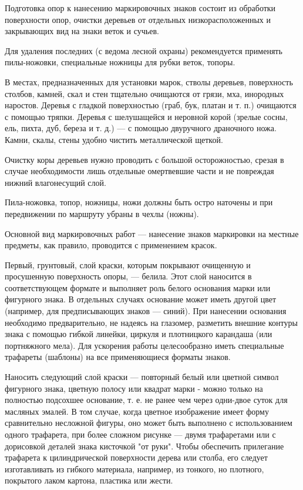 \documentclass[a4paper,12pt]{extarticle}
\begin{document}
Подготовка опор к нанесению маркировочных знаков состоит из обработки поверхности опор, очистки деревьев от отдельных
низкорасположенных и закрывающих вид на знаки веток и сучьев.

Для удаления последних (с ведома лесной охраны) рекомендуется применять пилы-ножовки, специальные ножницы для рубки
веток, топоры.

В местах, предназначенных для установки марок, стволы деревьев, поверхность столбов, камней, скал и стен тщательно
очищаются от грязи, мха, инородных наростов. Деревья с гладкой поверхностью (граб, бук, платан и т. п.) очищаются с
помощью тряпки. Деревья с шелушащейся и неровной корой (зрелые сосны, ель, пихта, дуб, береза и т. д.) --- с помощью
двуручного драночного ножа. Камни, скалы, стены удобно чистить металлической щеткой.

Очистку коры деревьев нужно проводить с большой осторожностью, срезая в случае необходимости лишь отдельные омертвевшие
части и не повреждая нижний влагонесущий слой.

Пила-ножовка, топор, ножницы, ножи должны быть остро наточены и при передвижении по маршруту убраны в чехлы (ножны).

Основной вид маркировочных работ --- нанесение знаков маркировки на местные предметы, как правило, проводится с
применением красок.

Первый, грунтовый, слой краски, которым покрывают очищенную и просушенную поверхность опоры, --- белила. Этот слой
наносится в соответствующем формате и выполняет роль белого основания марки или фигурного знака. В отдельных случаях
основание может иметь другой цвет (например, для предписывающих знаков --- синий). При нанесении основания необходимо
предварительно, не надеясь на глазомер, разметить внешние контуры знака с помощью гибкой линейки, циркуля и плотницкого
карандаша (или портняжного мела). Для ускорения работы целесообразно иметь специальные трафареты (шаблоны) на все
применяющиеся форматы знаков.

Наносить следующий слой краски --- повторный белый или цветной символ фигурного знака, цветную полосу или квадрат марки -
можно только на полностью подсохшее основание, т. е. не ранее чем через одни-двое суток для масляных эмалей. В том случае, когда цветное
изображение имеет форму сравнительно несложной фигуры, оно может быть выполнено с использованием одного трафарета, при
более сложном рисунке --- двумя трафаретами или с дорисовкой деталей знака кисточкой "от руки". Чтобы обеспечить
прилегание трафарета к цилиндрической поверхности дерева или столба, его следует изготавливать из гибкого материала,
например, из тонкого, но плотного, покрытого лаком картона, пластика или жести.
\end{document}
